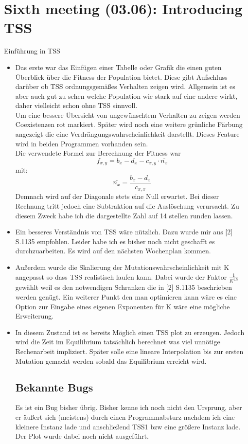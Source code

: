\documentclass{article}
\begin{document}
\section{Sixth meeting (03.06): Introducing TSS}
Einführung in TSS
\begin{itemize}
\item Das erste war das Einfügen einer Tabelle oder Grafik die einen guten Überblick über die Fitness der Population bietet. Diese gibt Aufschluss darüber ob TSS ordnungsgemäßes Verhalten zeigen wird. Allgemein ist es aber auch gut zu sehen welche Population wie stark auf eine andere wirkt, daher vielleicht schon ohne TSS sinnvoll.\\
Um eine bessere Übersicht von ungewünschtem Verhalten zu zeigen werden Coexistenzen rot markiert. Später wird noch eine weitere grünliche Färbung angezeigt die eine Verdrängungswahrscheinlichkeit darstellt.
Dieses Feature wird in beiden Programmen vorhanden sein.\\
Die verwendete Formel zur Berechnung der Fitness war \[ f_{x,y} = b_x - d_x - c_{x,y}\cdot \bar{n_x}\]
mit:
\[ \bar{n_x} = \frac{b_x - d_x}{c_{x,x}}\]
Demnach wird auf der Diagonale stets eine Null erwartet. Bei dieser Rechnung tritt jedoch eine Subtraktion auf die Auslöschung verursacht. Zu diesem Zweck habe ich die dargestellte Zahl auf 14 stellen runden lassen.
\item Ein besseres Verständnis von TSS wäre nützlich. Dazu wurde mir aus [2] S.1135 empfohlen. Leider habe ich es bisher noch nicht geschafft es durchzuarbeiten. Es wird auf den nächsten Wochenplan kommen.
\item Außerdem wurde die Skalierung der Mutationswahrscheinlichkeit mit K angepasst so dass TSS realistisch laufen kann. Dabei wurde der Faktor $\frac{1}{K^{1.5}}$ gewählt weil es den notwendigen Schranken die in [2] S.1135 beschrieben werden genügt. Ein weiterer Punkt den man optimieren kann wäre es eine Option zur Eingabe eines eigenen Exponenten für K wäre eine mögliche Erweiterung.
\item In diesem Zustand ist es bereits Möglich einen TSS plot zu erzeugen. Jedoch wird die Zeit im Equilibrium tatsächlich berechnet was viel unnötige Rechenarbeit impliziert. Später solle eine lineare Interpolation bis zur ersten Mutation gemacht werden sobald das Equilibrium erreicht wird.  
\subsection{Bekannte Bugs}
Es ist ein Bug bisher übrig. Bisher kenne ich noch nicht den Ursprung, aber er äußert sich (meistens) durch einen Programmabsturz nachdem ich eine kleinere Instanz lade und anschließend TSS1 bzw eine größere Instanz lade. Der Plot wurde dabei noch nicht ausgeführt.
\end{itemize}
  
\end{document}
